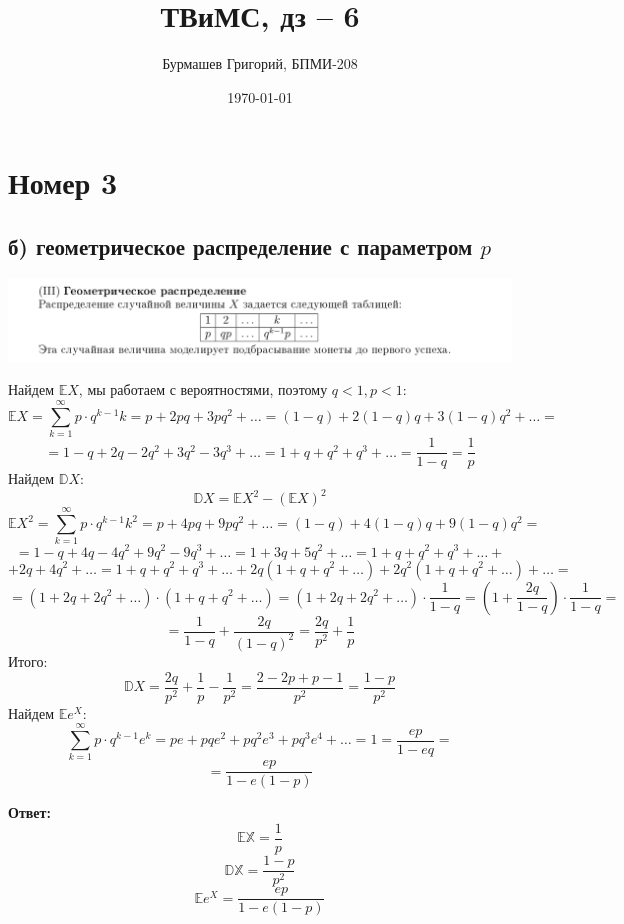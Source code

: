 \documentclass[a4paper,12pt]{article}
\author{Бурмашев Григорий, БПМИ-208}
\title{ТВиМС, дз -- 6}
\date{\today}
\begin{document}
\maketitle
\clearpage
\section*{Номер 3}
\subsection*{б) геометрическое распределение с параметром $p$}
\begin{center}
\includegraphics[scale=0.5]{1.png}
\end{center}
Найдем $\mathbb{E}X$, мы работаем с вероятностями, поэтому $q < 1, p < 1$:
\[
\mathbb{E}X = \sum_{k = 1}^{\infty} p \cdot q^{k-1} k = 
 p + 2pq + 3pq^2 + \ldots = (1-q) + 2(1-q)q + 3(1-q)q^2 + \ldots  =
\]
\[
= 
1 - q + 2q - 2q^2 + 3q^2 - 3q^3 + \ldots = 1 + q + q^2 + q^3 + \ldots = \frac{1}{1-q} = \frac{1}{p}
\]
Найдем $\mathbb{D}X$:
\[
\mathbb{D}X = \mathbb{E}X^2  - \left(\mathbb{E}X\right)^2
\]
\[
\mathbb{E}X^2 =  \sum_{k = 1}^{\infty} p \cdot q^{k-1} k^2  = p + 4pq + 9pq^2 + \ldots = (1-q) + 4(1-q)q + 9(1-q)q^2 = 
\]
\[
= 
1 - q + 4q - 4q^2 + 9q^2 - 9q^3 + \ldots = 1 + 3q + 5q^2 + \ldots = 1 + q + q^2 + q^3 + \ldots + 
\]
\[
+ 2q + 4q^2 + \ldots =  1 + q + q^2 + q^3 + \ldots + 2q(1 + q + q^2 + \ldots) + 2q^2(1 + q + q^2 + \ldots) + \ldots = 
\]
\[
=
(1 + 2q + 2q^2 + \ldots ) \cdot (1 + q + q^2 + \ldots) = (1 + 2q + 2q^2 + \ldots) \cdot \frac{1}{1-q} = \left(1 + \frac{2q}{1-q}\right) \cdot \frac{1}{1-q} =
\]
\[
=
 \frac{1}{1-q} + \frac{2q}{(1-q)^2} = \frac{2q}{p^2} + \frac{1}{p}
\]
Итого:
\[
\mathbb{D}X = \frac{2q}{p^2} + \frac{1}{p} - \frac{1}{p^2} = \frac{2 - 2p + p - 1}{p^2}= \frac{1-p}{p^2}
\]
Найдем $\mathbb{E}e^X$:
\[
\sum_{k = 1}^{\infty} p \cdot q^{k-1} e^k = pe + pqe^2 + pq^2e^3 + pq^3e^4 + \ldots = 1 = \frac{ep}{1-eq} = 
\]
\[
=
\frac{ep}{1 - e(1-p)}
\]
\begin{center}
\textbf{Ответ: } 
\[
\mathbb{EX} = \frac{1}{p}
\]
\[
\mathbb{DX} = \frac{1-p}{p^2}
\]
\[
\mathbb{E}e^X = \frac{ep}{1 - e(1-p)}
\]
\end{center}
\clearpage
\end{document}
